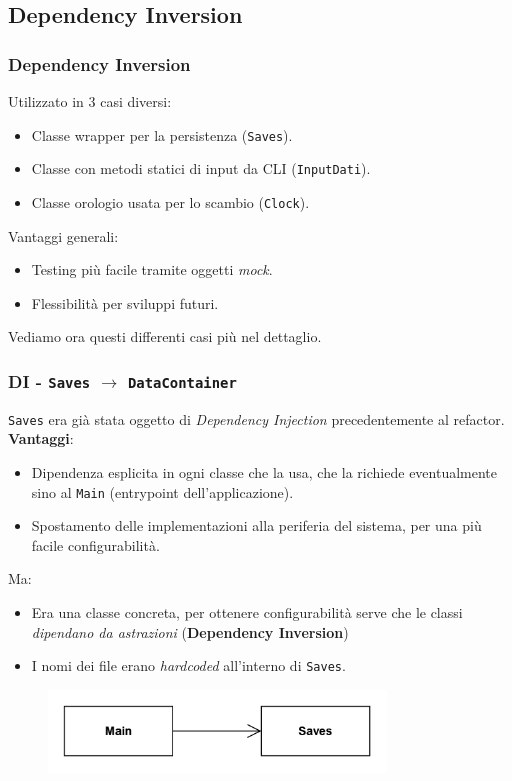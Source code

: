 \subsection{Dependency Inversion}
\beamertitle

\begin{frame}
    \frametitle{Dependency Inversion}
    Utilizzato in 3 casi diversi:
    \begin{itemize}
        \item Classe wrapper per la persistenza (\texttt{Saves}).
        \item Classe con metodi statici di input da CLI (\texttt{InputDati}).
        \item Classe orologio usata per lo scambio (\texttt{Clock}).
    \end{itemize}
    Vantaggi generali:
    \begin{itemize}
        \item {\color{green}Testing più facile} tramite oggetti \emph{mock}.
        \item {\color{green}Flessibilità} per sviluppi futuri.
    \end{itemize}
    Vediamo ora questi differenti casi più nel dettaglio.
\end{frame}

\begin{frame}
    \frametitle{DI - \texttt{Saves} $\to$ \texttt{DataContainer}}
    \texttt{Saves} era già stata oggetto di \emph{Dependency Injection} precedentemente al refactor.
    \textbf{Vantaggi}:
    \begin{itemize}
        \item {\color{green}Dipendenza esplicita} in ogni classe che la usa, che la richiede eventualmente sino al \texttt{Main}
        (entrypoint dell'applicazione).
        \item Spostamento delle implementazioni alla periferia del sistema, per una più {\color{green}facile configurabilità}.
    \end{itemize}

    Ma:
    \begin{itemize}
        \item Era una {\color{red}classe concreta}, per ottenere configurabilità serve che le classi \emph{dipendano da astrazioni}
        (\textbf{Dependency Inversion})
        \item I nomi dei file erano {\color{red}\emph{hardcoded}} all'interno di \texttt{Saves}.
    \end{itemize}
    \begin{figure}
        \includegraphics[width=0.8\textwidth]{img/dependencyInversion_before.png}
    \end{figure}
\end{frame}

